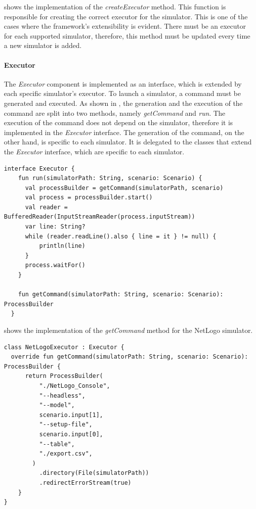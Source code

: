 \documentclass[12pt,a4paper,openright,twoside]{book}
\begin{document}
 shows the implementation of the \emph{createExecutor} method.
This function is responsible for creating the correct executor for the simulator.
This is one of the cases where the framework's extensibility is evident. 
There must be an executor for each supported simulator, therefore, this method must be updated every time a new simulator is added.

\paragraph*{Executor}

The \emph{Executor} component is implemented as an interface, which is extended by each specific simulator's executor.
To launch a simulator, a command must be generated and executed.
As shown in , the generation and the execution of the command are split into two methods, namely \emph{getCommand} and \emph{run}.
The execution of the command does not depend on the simulator, therefore it is implemented in the \emph{Executor} interface.
The generation of the command, on the other hand, is specific to each simulator. 
It is delegated to the classes that extend the \emph{Executor} interface, which are specific to each simulator.

\begin{lstlisting}[style=my-kotlin, language=my-kotlin, label={lst:executor-interface}, caption={Executor interface.}]
  interface Executor {
    fun run(simulatorPath: String, scenario: Scenario) {
      val processBuilder = getCommand(simulatorPath, scenario)
      val process = processBuilder.start()
      val reader = BufferedReader(InputStreamReader(process.inputStream))
      var line: String?
      while (reader.readLine().also { line = it } != null) {
          println(line)
      }
      process.waitFor()
    }

    fun getCommand(simulatorPath: String, scenario: Scenario): ProcessBuilder
  }
\end{lstlisting}

 shows the implementation of the \emph{getCommand} method for the NetLogo simulator.

\begin{lstlisting}[style=my-kotlin, language=my-kotlin, label={lst:netlogo-executor}, caption={NetlogoExecutor class.}]
class NetLogoExecutor : Executor {
  override fun getCommand(simulatorPath: String, scenario: Scenario): ProcessBuilder {
      return ProcessBuilder(
          "./NetLogo_Console",
          "--headless",
          "--model",
          scenario.input[1],
          "--setup-file",
          scenario.input[0],
          "--table",
          "./export.csv",
        )
          .directory(File(simulatorPath))
          .redirectErrorStream(true)
    }
}
\end{lstlisting}
\end{document}
